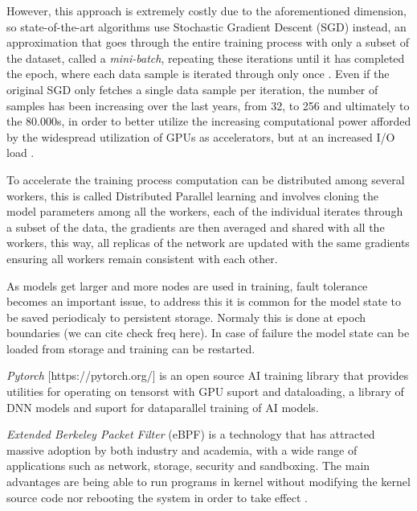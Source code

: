 \documentclass[conference]{IEEEtran}
\begin{document}
    However, this approach is extremely costly due to the aforementioned dimension, so state-of-the-art algorithms use Stochastic Gradient Descent (SGD) instead, an approximation that goes through the entire training process with only a subset of the dataset, called a \textit{mini-batch}, repeating these iterations until it has completed the epoch, where each data sample is iterated through only once \cite{sgd}. Even if the original SGD only fetches a single data sample per iteration, the number of samples has been increasing over the last years, from 32, to 256 and ultimately to the 80.000s, in order to better utilize the increasing computational power afforded by the widespread utilization of GPUs as accelerators, but at an increased I/O load \cite{nvme}.

    To accelerate the training process computation can be distributed among several workers, this is called Distributed Parallel learning and involves cloning
    the model parameters among all the workers, each of the individual iterates through a subset of the data, the gradients are then averaged and shared with all the workers,
    this way, all replicas of the network are updated with the same gradients ensuring all workers remain consistent with each other.

    As models get larger and more nodes are used in training, fault tolerance becomes an important issue, to address this it is common for the model state to be
    saved periodicaly to persistent storage. Normaly this is done at epoch boundaries (we can cite check freq here). In case of failure the model state can be loaded from
    storage and training can be restarted. 
    
    \textit{Pytorch} [https://pytorch.org/] is an open source AI training library that provides utilities for operating on tensorst with GPU suport and dataloading, a library of
    DNN models and suport for dataparallel training of AI models.

    \textit{Extended Berkeley Packet Filter} (eBPF) is a technology that has attracted massive adoption by both industry and academia, with a wide range of applications such as network, storage, security and sandboxing. 
    The main advantages are being able to run programs in kernel without modifying the kernel source code nor rebooting the system in order to take effect \cite{eBPFSurvey}.
\end{document}

